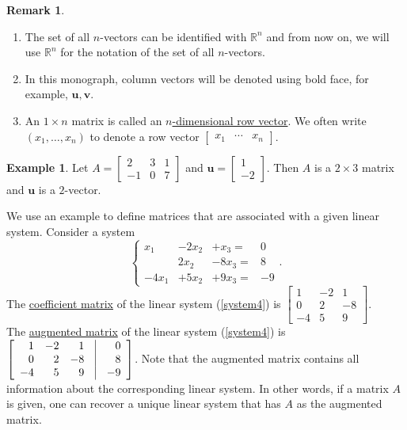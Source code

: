 \documentclass[12pt,letterpaper]{book}
\numberwithin{equation}{section}
\theoremstyle{definition}
\newtheorem{example}[thm]{\textbf{Example}}
\newtheorem{remark}[thm]{\textbf{Remark}}
\newcommand{\vu}{\bm{u}}
\newcommand{\vv}{\bm{v}}
\begin{document}
\begin{remark}\quad
\begin{enumerate}
\item The set of all $n$-vectors can be identified with $\mathbb{R}^n$ and from now on, we will use $\mathbb{R}^n$ for the notation of the set of all $n$-vectors.
\item In this monograph, column vectors will be denoted using bold face, for example, $\vu,\vv$.
\item An $1\times n$ matrix is called an \underline{$n$-dimensional row vector}. We often write $(x_1,\ldots,x_n)$ to denote a row vector $\left[\begin{array}{ccc} x_1 & \cdots & x_n \end{array}\right]$.
\end{enumerate}
\end{remark}

\begin{example}
Let $A=\displaystyle{\left[\begin{array}{rrr}2&3&1\\-1&0&7\end{array}\right]}$ and $\vu=\left[\begin{array}{r} 1 \\ -2 \end{array}\right]$. Then $A$ is a $2 \times 3$ matrix and $\vu$  is a $2$-vector.
\end{example}

We use an example to define matrices that are associated with a given linear system. Consider a system
\begin{equation}\label{system4} \left\{\begin{array}{rrrr}
x_1&-2x_2&+x_3=&0
\\ &2x_2 &-8x_3=&8 \\ -4x_1&+5x_2&+9x_3=&-9 \end{array}\right. .\end{equation}
The \underline{coefficient matrix} of the linear system (\ref{system4}) is
$\displaystyle{\left[\begin{array}{rrr}1&-2&1\\0&2&-8
\\-4&5&9\end{array}\right]}$.\\
The \underline{augmented matrix} of the linear system (\ref{system4}) is
$\displaystyle{\left[\begin{array}{rrr@{\quad}|@{\quad}r} 1 & -2 & 1 & 0 \\ 0 & 2 & -8 & 8 \\ -4 & 5 & 9 & -9 \end{array}\right]}$. Note that the augmented matrix contains all information about the corresponding linear system. In other words, if a matrix $A$ is given, one can recover a unique linear system that has $A$ as the augmented matrix. \\
\end{document}
